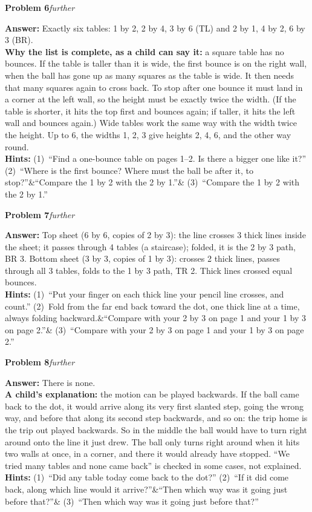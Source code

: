 \documentclass[11pt,letterpaper]{article}
\newcommand{\prob}[3]{\needspace{3\baselineskip}\par\smallskip\textbf{#1}\enspace\textit{#2}\enspace{\small(#3)}\par}
\newcommand{\ans}{\textbf{Answer:} }
\newcommand{\hints}[3]{\textbf{Hints:} (1)~#1 (2)~#2\ifx&#3&\else{} (3)~#3\fi\par}
\newcommand{\further}{further}
\begin{document}
\prob{Problem 6}{\further}{page 6}
\ans Exactly six tables: 1 by 2, 2 by 4, 3 by 6 (TL) and 2 by 1, 4 by 2, 6 by 3 (BR).\\
\textbf{Why the list is complete, as a child can say it:} a square table has no bounces. If the table is taller than it is wide, the first bounce is on the right wall, when the ball has gone up as many squares as the table is wide. It then needs that many squares again to cross back. To stop after one bounce it must land in a corner at the left wall, so the height must be exactly twice the width. (If the table is shorter, it hits the top first and bounces again; if taller, it hits the left wall and bounces again.) Wide tables work the same way with the width twice the height. Up to 6, the widths 1, 2, 3 give heights 2, 4, 6, and the other way round.\\
\hints{``Find a one-bounce table on pages 1--2. Is there a bigger one like it?''}{``Where is the first bounce? Where must the ball be after it, to stop?''}{``Compare the 1 by 2 with the 2 by 1.''}

\prob{Problem 7}{\further}{page 7}
\ans Top sheet (6 by 6, copies of 2 by 3): the line crosses 3 thick lines inside the sheet; it passes through 4 tables (a staircase); folded, it is the 2 by 3 path, BR 3. Bottom sheet (3 by 3, copies of 1 by 3): crosses 2 thick lines, passes through all 3 tables, folds to the 1 by 3 path, TR 2. Thick lines crossed equal bounces.\\
\hints{``Put your finger on each thick line your pencil line crosses, and count.''}{Fold from the far end back toward the dot, one thick line at a time, always folding backward.}{``Compare with your 2 by 3 on page 1 and your 1 by 3 on page 2.''}

\prob{Problem 8}{\further}{page 8}
\ans There is none.\\
\textbf{A child's explanation:} the motion can be played backwards. If the ball came back to the dot, it would arrive along its very first slanted step, going the wrong way, and before that along its second step backwards, and so on: the trip home is the trip out played backwards. So in the middle the ball would have to turn right around onto the line it just drew. The ball only turns right around when it hits two walls at once, in a corner, and there it would already have stopped. ``We tried many tables and none came back'' is checked in some cases, not explained.\\
\hints{``Did any table today come back to the dot?''}{``If it did come back, along which line would it arrive?''}{``Then which way was it going just before that?''}
\end{document}
